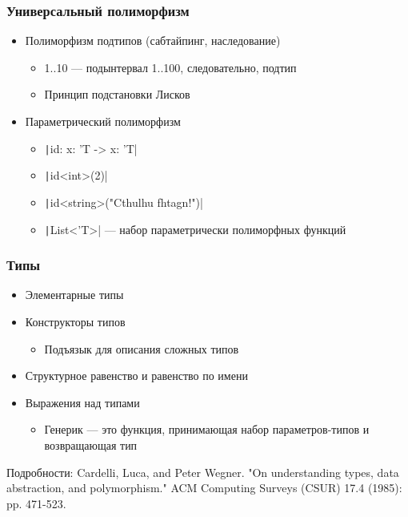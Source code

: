 \documentclass{../../slides-style}
\begin{document}
    \begin{frame}
        \frametitle{Универсальный полиморфизм}
        \begin{itemize}
            \item Полиморфизм подтипов (сабтайпинг, наследование)
            \begin{itemize}
                \item 1..10 --- подынтервал 1..100, следовательно, подтип
                \item Принцип подстановки Лисков
            \end{itemize}
            \item Параметрический полиморфизм
            \begin{itemize}
                \item \texttt|id: x: 'T -> x: 'T|
                \item \texttt|id<int>(2)|
                \item \texttt|id<string>("Cthulhu fhtagn!")|
                \item \texttt|List<'T>| --- набор параметрически полиморфных функций
            \end{itemize}
        \end{itemize}
    \end{frame}

    \begin{frame}
        \frametitle{Типы}
        \begin{itemize}
            \item Элементарные типы
            \item Конструкторы типов
            \begin{itemize}
                \item Подъязык для описания сложных типов
            \end{itemize}
            \item Структурное равенство и равенство по имени
            \item Выражения над типами
            \begin{itemize}
                \item Генерик --- это функция, принимающая набор параметров-типов и возвращающая тип
            \end{itemize}
        \end{itemize}

        Подробности: Cardelli, Luca, and Peter Wegner. "On understanding types, data abstraction, and polymorphism." ACM Computing Surveys (CSUR) 17.4 (1985): pp. 471-523.
    \end{frame}
\end{document}
